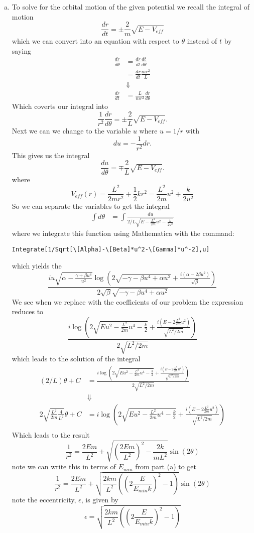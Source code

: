 \documentclass[11pt]{article}
\numberwithin{equation}{section}
\begin{document}
\begin{enumerate}[(a)]
\item 
To solve for the orbital motion of the given potential we recall the integral of motion
$$\frac{dr}{dt} = \pm\frac{2}{m}\sqrt{E-V_{eff}}$$
which we can convert into an equation with respect to $\theta$ instead of $t$ by saying
\begin{align*}
\frac{dr}{d\theta} &= \frac{dr}{dt}\frac{dt}{d\theta}\\
&= \frac{dr}{dt}\frac{mr^2}{L}\\
&\Downarrow\\
\frac{dr}{dt} &= \frac{L}{mr^2}\frac{dr}{d\theta}
\end{align*}
Which coverts our integral into
$$\frac{1}{r^2}\frac{dr}{d\theta} = \pm\frac{2}{L}\sqrt{E-V_{eff}}.$$
Next we can we change to the variable $u$ where $u=1/r$ with
$$du = -\frac{1}{r^2}dr.$$
This gives us the integral
$$\frac{du}{d\theta} = \mp\frac{2}{L}\sqrt{E-V_{eff}}.$$
where
$$V_{eff}(r) = \frac{L^2}{2mr^2} + \frac{1}{2}kr^2 = \frac{L^2}{2m}u^2 + \frac{k}{2u^2}$$
So we can separate the variables to get the integral
\begin{align*}
\int d\theta &= \int\frac{du}{2/L\sqrt{E-\frac{L^2}{2m}u^2-\frac{k}{2u^2}}}
\end{align*}
where we integrate this function using Mathematica with the command:
\begin{verbatim}
Integrate[1/Sqrt[\[Alpha]-\[Beta]*u^2-\[Gamma]*u^-2],u]
\end{verbatim}
which yields the
$$\frac{i u \sqrt{\alpha -\frac{\gamma +\beta  u^4}{u^2}} \log \left(2 \sqrt{-\gamma -\beta  u^4+\alpha  u^2}+\frac{i \left(\alpha -2 \beta  u^2\right)}{\sqrt{\beta }}\right)}{2 \sqrt{\beta } \sqrt{-\gamma -\beta  u^4+\alpha  u^2}}$$
We see when we replace with the coefficients of our problem the expression reduces to
$$\frac{i \log \left(2 \sqrt{Eu^2-\frac{L^2}{2m}u^4 -\frac{k}{2}}+\frac{i\left(E-2\frac{L^2}{2m}u^2\right)}{\sqrt{L^2/2m}}\right)}{2\sqrt{L^2/2m}}$$
which leads to the solution of the integral
\begin{align*}
(2/L)\theta + C &= \frac{i \log \left(2 \sqrt{Eu^2-\frac{L^2}{2m}u^4 -\frac{k}{2}}+\frac{i\left(E-2\frac{L^2}{2m}u^2\right)}{\sqrt{L^2/2m}}\right)}{2\sqrt{L^2/2m}}\\
&\Downarrow\\
2\sqrt{\frac{L^2}{2m}\frac{4}{L^2}}\theta + C &= i \log \left(2 \sqrt{Eu^2-\frac{L^2}{2m}u^4 -\frac{k}{2}}+\frac{i\left(E-2\frac{L^2}{2m}u^2\right)}{\sqrt{L^2/2m}}\right)\\
\end{align*}
Which leads to the result
$$\frac{1}{r^2} = \frac{2Em}{L^2}+\sqrt{\left(\frac{2Em}{L^2}\right)^2 - \frac{2k}{mL^2}}\sin(2\theta)$$
note we can write this in terms of $E_{min}$ from part (a) to get
\begin{equation}
\frac{1}{r^2} = \frac{2Em}{L^2}+\sqrt{\frac{2km}{L^2}\left(\left(2\frac{E}{E_{min}k}\right)^2 - 1\right)}\sin(2\theta)
\label{Part1B}
\end{equation}
note the eccentricity, $\epsilon$, is given by
$$\epsilon=\sqrt{\frac{2km}{L^2}\left(\left(2\frac{E}{E_{min}k}\right)^2 - 1\right)}$$


\end{enumerate}
\end{document}
